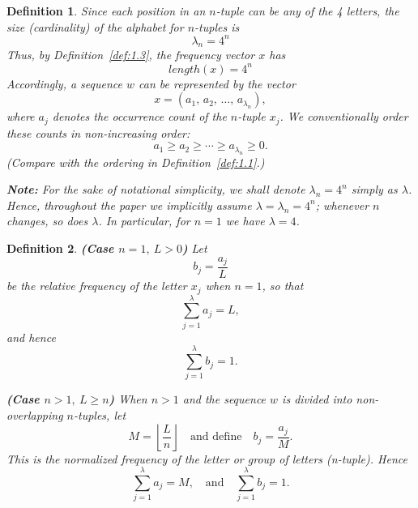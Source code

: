 \documentclass{article}
\newtheorem{Definition}{Definition}[section]
\theoremstyle{remark}
\begin{document}
\begin{Definition}\label{def:1.4}
Since each position in an \(n\)-tuple can be any of the 4 letters, the size (cardinality) of the alphabet for \(n\)-tuples is
\begin{equation}
\lambda_n = 4^n
\end{equation}
Thus, by Definition~\ref{def:1.3}, the frequency vector \(x\) has 
\begin{equation}
length(x) = 4^n
\end{equation}
Accordingly, a sequence \(w\) can be represented by the vector
\begin{equation}
x = (a_1,\, a_2,\, \ldots,\, a_{\lambda_n}),
\end{equation}
where \(a_j\) denotes the occurrence count of the \(n\)-tuple \(x_j\). We conventionally order these counts in non-increasing order:
\begin{equation}
a_1 \ge a_2 \ge \cdots \ge a_{\lambda_n }\ge 0.
\end{equation}
(Compare with the ordering in Definition~\ref{def:1.1}.)

\textbf{Note:} For the sake of notational simplicity, we shall denote \(\lambda_n = 4^n\) simply as \(\lambda\).
Hence, throughout the paper we implicitly assume
\(\lambda=\lambda_n=4^n\); whenever \(n\) changes,
so does \(\lambda\).  In particular, for \(n=1\) we have
\(\lambda=4\).

\end{Definition}

\begin{Definition}\label{def:1.5}
\textbf{(Case \(n=1,\ L>0\))} Let 
\begin{equation}
b_j = \frac{a_j}{L}
\end{equation}
be the relative frequency of the letter \(x_j\) \emph{when \(n=1\)}, so that
\begin{equation}
\sum_{j=1}^\lambda a_j = L,
\end{equation}
and hence
\begin{equation}
\sum_{j=1}^\lambda b_j = 1.
\end{equation}

\textbf{(Case \(n>1,\ L\ge n\))} When \(n>1\) and the sequence \(w\) is divided into non-overlapping \(n\)-tuples, let 
\begin{equation}
M = \left\lfloor \frac{L}{n} \right\rfloor
\quad \text{and define}\quad
b_j = \frac{a_j}{M}.
\end{equation}
This is the normalized frequency of the letter or group of letters (n-tuple).
Hence 
\begin{equation}
\sum_{j=1}^\lambda a_j = M,
\quad\text{and}\quad
\sum_{j=1}^\lambda b_j = 1.
\end{equation}
\end{Definition}
\end{document}
